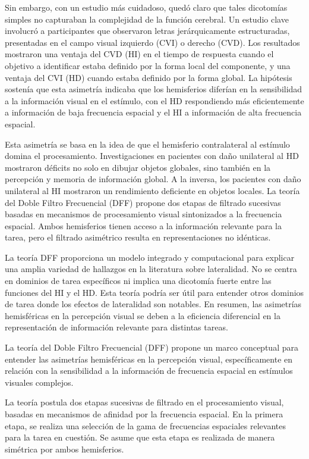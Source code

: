 \documentclass[12pt,oneside]{uhthesis}
\begin{document}
Sin embargo, con un estudio más cuidadoso, quedó claro que tales dicotomías simples no capturaban la complejidad de la función cerebral. Un estudio clave involucró a participantes que observaron letras jerárquicamente estructuradas, presentadas en el campo visual izquierdo (CVI) o derecho (CVD). Los resultados mostraron una ventaja del CVD (HI) en el tiempo de respuesta cuando el objetivo a identificar estaba definido por la forma local del componente, y una ventaja del CVI (HD) cuando estaba definido por la forma global. La hipótesis sostenía que esta asimetría indicaba que los hemisferios diferían en la sensibilidad a la información visual en el estímulo, con el HD respondiendo más eficientemente a información de baja frecuencia espacial y el HI a información de alta frecuencia espacial.

Esta asimetría se basa en la idea de que el hemisferio contralateral al estímulo domina el procesamiento. Investigaciones en pacientes con daño unilateral al HD mostraron déficits no solo en dibujar objetos globales, sino también en la percepción y memoria de información global. A la inversa, los pacientes con daño unilateral al HI mostraron un rendimiento deficiente en objetos locales. La teoría del Doble Filtro Frecuencial (DFF) propone dos etapas de filtrado sucesivas basadas en mecanismos de procesamiento visual sintonizados a la frecuencia espacial. Ambos hemisferios tienen acceso a la información relevante para la tarea, pero el filtrado asimétrico resulta en representaciones no idénticas.

La teoría DFF proporciona un modelo integrado y computacional para explicar una amplia variedad de hallazgos en la literatura sobre lateralidad. No se centra en dominios de tarea específicos ni implica una dicotomía fuerte entre las funciones del HI y el HD. Esta teoría podría ser útil para entender otros dominios de tarea donde los efectos de lateralidad son notables. En resumen, las asimetrías hemisféricas en la percepción visual se deben a la eficiencia diferencial en la representación de información relevante para distintas tareas.

La teoría del Doble Filtro Frecuencial (DFF) propone un marco conceptual para entender las asimetrías hemisféricas en la percepción visual, específicamente en relación con la sensibilidad a la información de frecuencia espacial en estímulos visuales complejos.

La teoría postula dos etapas sucesivas de filtrado en el procesamiento visual, basadas en mecanismos de afinidad por la frecuencia espacial. En la primera etapa, se realiza una selección de la gama de frecuencias espaciales relevantes para la tarea en cuestión. Se asume que esta etapa es realizada de manera simétrica por ambos hemisferios.
\end{document}
